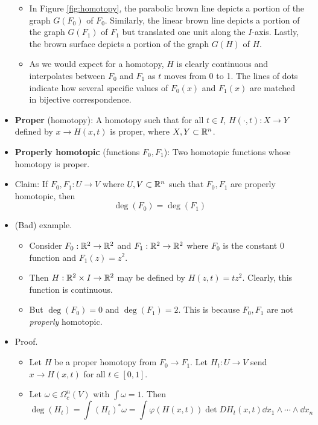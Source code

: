 \documentclass[../notes.tex]{subfiles}
\begin{document}
\begin{itemize}
\begin{itemize}
\begin{itemize}
        \end{itemize}
        \item In Figure \ref{fig:homotopy}, the parabolic brown line depicts a portion of the graph $G(F_0)$ of $F_0$. Similarly, the linear brown line depicts a portion of the graph $G(F_1)$ of $F_1$ but translated one unit along the $I$-axis. Lastly, the brown surface depicts a portion of the graph $G(H)$ of $H$.
        \item As we would expect for a homotopy, $H$ is clearly continuous and interpolates between $F_0$ and $F_1$ as $t$ moves from 0 to 1. The lines of dots indicate how several specific values of $F_0(x)$ and $F_1(x)$ are matched in bijective correspondence.
    \end{itemize}
    \item \textbf{Proper} (homotopy): A homotopy such that for all $t\in I$, $H(\cdot,t):X\to Y$ defined by $x\to H(x,t)$ is proper, where $X,Y\subset\mathbb{R}^n$.
    \item \textbf{Properly homotopic} (functions $F_0,F_1$): Two homotopic functions whose homotopy is proper.
    \item Claim: If $F_0,F_1:U\to V$ where $U,V\subset\mathbb{R}^n$ such that $F_0,F_1$ are properly homotopic, then
    \begin{equation*}
        \deg(F_0) = \deg(F_1)
    \end{equation*}
    \item (Bad) example.
    \begin{itemize}
        \item Consider $F_0:\mathbb{R}^2\to\mathbb{R}^2$ and $F_1:\mathbb{R}^2\to\mathbb{R}^2$ where $F_0$ is the constant 0 function and $F_1(z)=z^2$.
        \item Then $H:\mathbb{R}^2\times I\to\mathbb{R}^2$ may be defined by $H(z,t)=tz^2$. Clearly, this function is continuous.
        \item But $\deg(F_0)=0$ and $\deg(F_1)=2$. This is because $F_0,F_1$ are not \emph{properly} homotopic.
    \end{itemize}
    \item Proof.
    \begin{itemize}
        \item Let $H$ be a proper homotopy from $F_0\to F_1$. Let $H_t:U\to V$ send $x\to H(x,t)$ for all $t\in[0,1]$.
        \item Let $\omega\in\Omega_c^n(V)$ with $\int\omega=1$. Then
        \begin{equation*}
            \deg(H_t) = \int(H_t)^*\omega
            = \int\varphi(H(x,t))\det DH_t(x,t)\dd{x_1}\wedge\cdots\wedge\dd{x_n}

\end{equation*}
\end{itemize}
\end{itemize}
\end{document}
